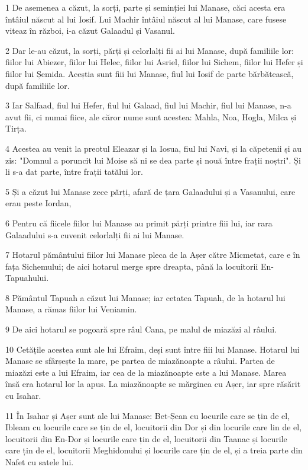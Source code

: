 \par 1 De asemenea a căzut, la sorți, parte și seminției lui Manase, căci acesta era întâiul născut al lui Iosif. Lui Machir întâiul născut al lui Manase, care fusese viteaz în război, i-a căzut Galaadul și Vasanul.
\par 2 Dar le-au căzut, la sorți, părți și celorlalți fii ai lui Manase, după familiile lor: fiilor lui Abiezer, fiilor lui Helec, fiilor lui Asriel, fiilor lui Sichem, fiilor lui Hefer și fiilor lui Șemida. Aceștia sunt fiii lui Manase, fiul lui Iosif de parte bărbătească, după familiile lor.
\par 3 Iar Salfaad, fiul lui Hefer, fiul lui Galaad, fiul lui Machir, fiul lui Manase, n-a avut fii, ci numai fiice, ale căror nume sunt acestea: Mahla, Noa, Hogla, Milca și Tirța.
\par 4 Acestea au venit la preotul Eleazar și la Iosua, fiul lui Navi, și la căpetenii și au zis: "Domnul a poruncit lui Moise să ni se dea parte și nouă între frații noștri". Și li s-a dat parte, între frații tatălui lor.
\par 5 Și a căzut lui Manase zece părți, afară de țara Galaadului și a Vasanului, care erau peste Iordan,
\par 6 Pentru că fiicele fiilor lui Manase au primit părți printre fiii lui, iar rara Galaadului s-a cuvenit celorlalți fii ai lui Manase.
\par 7 Hotarul pământului fiilor lui Manase pleca de la Așer către Micmetat, care e în fața Sichemului; de aici hotarul merge spre dreapta, până la locuitorii En-Tapuahului.
\par 8 Pământul Tapuah a căzut lui Manase; iar cetatea Tapuah, de la hotarul lui Manase, a rămas fiilor lui Veniamin.
\par 9 De aici hotarul se pogoară spre râul Cana, pe malul de miazăzi al râului.
\par 10 Cetățile acestea sunt ale lui Efraim, deși sunt între fiii lui Manase. Hotarul lui Manase se sfârșește la mare, pe partea de miazănoapte a râului. Partea de miazăzi este a lui Efraim, iar cea de la miazănoapte este a lui Manase. Marea însă era hotarul lor la apus. La miazănoapte se mărginea cu Așer, iar spre răsărit cu Isahar.
\par 11 În Isahar și Așer sunt ale lui Manase: Bet-Șean cu locurile care se țin de el, Ibleam cu locurile care se țin de el, locuitorii din Dor și din locurile care lin de el, locuitorii din En-Dor și locurile care țin de el, locuitorii din Taanac și locurile care țin de el, locuitorii Meghidonului și locurile care țin de el, și a treia parte din Nafet cu satele lui.
